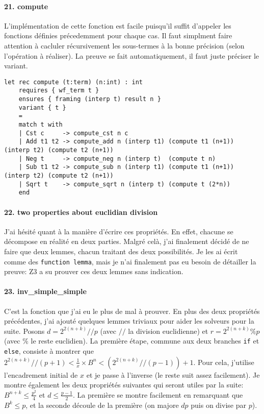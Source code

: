 \documentclass[a4paper]{article}%
\begin{document}
	\paragraph{21. compute} L'implémentation de cette fonction est facile puisqu'il suffit d'appeler les fonctions
	définies précedemment pour chaque cas. Il faut simplment faire attention à cacluler récursivement les sous-termes
	à la bonne précision (selon l'opération à réaliser). La preuve se fait automatiquement, il faut juste préciser le variant.
	\begin{verbatim}
let rec compute (t:term) (n:int) : int
	requires { wf_term t }
	ensures { framing (interp t) result n }
	variant { t }
	=
	match t with
	| Cst c     -> compute_cst n c
	| Add t1 t2 -> compute_add n (interp t1) (compute t1 (n+1)) (interp t2) (compute t2 (n+1))
	| Neg t     -> compute_neg n (interp t)  (compute t n)
	| Sub t1 t2 -> compute_sub n (interp t1) (compute t1 (n+1)) (interp t2) (compute t2 (n+1))
	| Sqrt t    -> compute_sqrt n (interp t) (compute t (2*n))
	end
	\end{verbatim}

	\paragraph{22. two properties about euclidian division } J'ai hésité quant à la manière d'écrire ces propriétés.
	En effet, chacune se décompose en réalité en deux parties. Malgré celà, j'ai finalement décidé de ne faire que deux lemmes,
	chacun traitant des deux possibilités. Je les ai écrit comme des \texttt{function lemma}, mais je n'ai finalement
	pas eu besoin de détailler la preuve: Z3 a su prouver ces deux lemmes sans indication.

	\paragraph{23. inv\_simple\_simple} C'est la fonction que j'ai eu le plus de mal à prouver. En plus des deux propriétés précédentes,
	j'ai ajouté quelques lemmes triviaux pour aider les solveurs pour la suite.
	Posons $d = 2^{2(n+k)} // p$ (avec $//$ la division euclidienne) et $r = 2^{2(n+k)} \% p$ (avec $\%$ le reste euclidien).
	La première étape, commune aux deux branches \texttt{if} et \texttt{else},
	consiste à montrer que $2^{2(n+k)} // (p+1) < \frac{1}{x} \times B^n < (2^{2(n+k)} // (p-1)) + 1$.
	Pour cela, j'utilise l'encadrement initial de $x$ et je passe à l'inverse (le reste suit assez facilement).
	Je montre également les deux propriétés suivantes qui seront utiles par la suite: $B^{n+k} \leq \frac{p^2}{4}$
	et $d \leq \frac{p-1}{2}$. La première se montre facilement en remarquant que $B^k \leq p$, et la seconde découle
	de la première (on majore $dp$ puis on divise par $p$).\\
\end{document}
